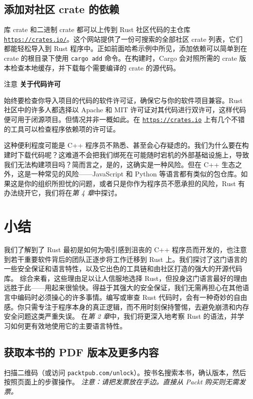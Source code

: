 \subsection{添加对社区 crate 的依赖}
\label{idx:idx_ea139784}
库 crate 和二进制 crate 都可以上传到 Rust 社区代码的主仓库 \href{https://crates.io/}{\texttt{https:/\allowbreak{}/\allowbreak{}crates.\allowbreak{}io/\allowbreak{}}}。这个网站提供了一份可搜索的全部社区 crate 列表，它们都能轻松导入到 Rust 程序中。正如前面哈希示例中所见，添加依赖可以简单到在 crate 的根目录下使用 \texttt{cargo add} 命令。在构建时，Cargo 会对照所需的 crate 版本检查本地缓存，并下载每个需要编译的 crate 的源代码。
\label{idx:idx_2daa04fa}
\begin{myNotic}{注意}
\textbf{关于代码许可}

始终要检查你导入项目的代码的软件许可证，确保它与你的软件项目兼容。Rust 社区中的许多人都选择以 Apache 和 MIT 许可证对其代码进行双许可，这样代码便可用于闭源项目。但情况并非一概如此。在 \href{https://crates.io}{\texttt{https:/\allowbreak{}/\allowbreak{}crates.\allowbreak{}io}} 上有几个不错的工具可以检查程序依赖项的许可证。
\end{myNotic}
\label{idx:idx_62b9b13f}
这种便利程度可能是 C++ 程序员不熟悉、甚至会心存疑虑的。我们为什么要在构建时下载代码呢？这难道不会把我们绑死在可能随时宕机的外部基础设施上，导致我们无法构建项目吗？简而言之，是的，这确实是一种风险。但在 C++ 生态之外，这是一种常见的风险——JavaScript 和 Python 等语言都有类似的包仓库。如果这是你的组织所担忧的问题，或者只是你作为程序员不愿承担的风险，Rust 有办法绕开它，我们将在\emph{第 4 章}中探讨。
\section{小结}
我们了解到了 Rust 最初是如何为吸引感到沮丧的 C++ 程序员而开发的，也注意到若干重要软件背后的团队正逐步将工作迁移到 Rust 上。我们探讨了这门语言的一些安全保证和语言特性，以及它出色的工具链和由社区打造的强大的开源代码库。
综合来看，这些理由足以让人信服地选择 Rust，但投身这门语言最好的理由远胜于此——用起来很愉快。得益于其强大的安全保证，我们无需再担心在其他语言中编码时必须操心的许多事情。编写或审查 Rust 代码时，会有一种奇妙的自由感。你只需专注于程序本身的真正逻辑，而不用时刻保持警惕，去避免崩溃和内存安全问题这类严重失误。
在\emph{第 2 章}中，我们将更深入地考察 Rust 的语法，并学习如何更有效地使用它的主要语言特性。
\begin{samepage}
\subsection{获取本书的 PDF 版本及更多内容}
扫描二维码（或访问 \texttt{packtpub.\allowbreak{}com/\allowbreak{}unlock}）。按书名搜索本书，确认版本，然后按照页面上的步骤操作。
\emph{注意：请把发票放在手边。直接从 Packt 购买则无需发票。}
\end{samepage}
